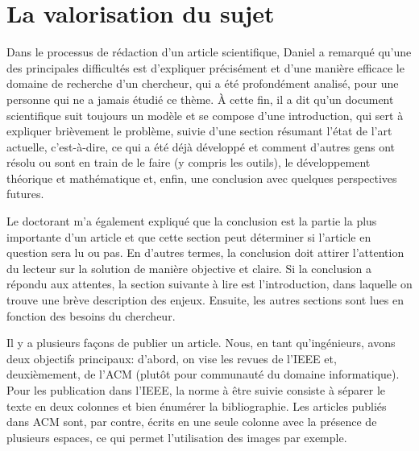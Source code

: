 \documentclass{article}
\begin{document}
\section{La valorisation du sujet}

Dans le processus de rédaction d'un article scientifique, Daniel a remarqué
qu'une des principales difficultés est d'expliquer précisément et d'une manière
efficace le domaine de recherche d'un chercheur, qui a été profondément
analisé, pour une personne qui ne a jamais étudié ce thème. À cette fin, il a
dit qu'un document scientifique suit toujours un modèle et se compose d'une
introduction, qui sert à expliquer brièvement le problème, suivie d'une
section résumant l'état de l'art actuelle, c'est-à-dire, ce qui a été déjà
développé et comment d'autres gens ont résolu ou sont en train de le faire (y
compris les outils), le développement théorique et mathématique et, enfin, une
conclusion avec quelques perspectives futures.

\vspace{12pt}

Le doctorant m'a également expliqué que la conclusion est la partie la plus
importante d'un article et que cette section peut déterminer si l'article en
question sera lu ou pas. En d'autres termes, la conclusion doit attirer
l'attention du lecteur sur la solution de manière objective et claire. Si
la conclusion a répondu aux attentes, la section suivante à lire est
l'introduction, dans laquelle  on trouve une brève description des enjeux.
Ensuite, les autres sections sont lues en fonction des besoins du chercheur.

\vspace{12pt}

Il y a plusieurs façons de publier un article. Nous, en tant qu'ingénieurs,
avons deux objectifs principaux: d'abord, on vise les revues de l'IEEE et,
deuxièmement, de l'ACM (plutôt pour communauté du domaine informatique).
Pour les publication dans l'IEEE, la norme à être suivie consiste à séparer
le texte en deux colonnes et bien énumérer la bibliographie. Les articles
publiés dans ACM sont, par contre, écrits en une seule colonne avec la présence
de plusieurs espaces, ce qui permet l'utilisation des images par exemple.

\vspace{12pt}
\end{document}
